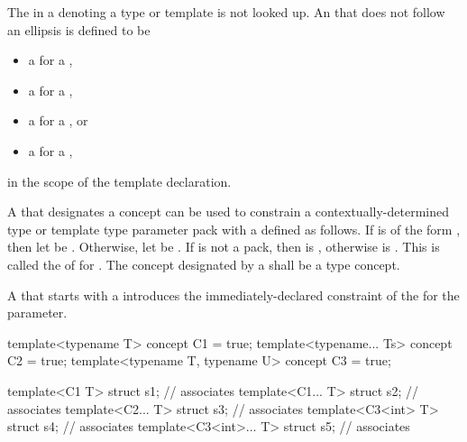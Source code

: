 \pnum
The  in
a  denoting a type or template
is not looked up.
An  that does not follow an ellipsis
is defined to be
\begin{itemize}
\item
a  for a ,
\item
a  for a ,
\item
a  for a , or
\item
a  for a ,
\end{itemize}
in the scope of the template declaration.

\pnum
A   that designates a concept 
can be used to constrain a
contextually-determined type or template type parameter pack 
with a   defined as follows.
If  is of the form ,
then let  be .
Otherwise, let  be .
If  is not a pack,
then  is ,
otherwise  is .
This   is called the
of  for .
The concept designated by a 
shall be a type concept.

\pnum
A  that starts with a 
introduces the immediately-declared constraint
of the  for the parameter.
\begin{example}
\begin{codeblock}
template<typename T> concept C1 = true;
template<typename... Ts> concept C2 = true;
template<typename T, typename U> concept C3 = true;

template<C1 T> struct s1;               // associates 
template<C1... T> struct s2;            // associates 
template<C2... T> struct s3;            // associates 
template<C3<int> T> struct s4;          // associates 
template<C3<int>... T> struct s5;       // associates 
\end{codeblock}
\end{example}

